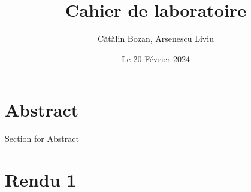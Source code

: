 \documentclass{article}
\title{Cahier de laboratoire}
\date{Le 20 Février 2024}
\author{Cătălin Bozan, Arsenescu Liviu}
\begin{document}
    \maketitle
    \newpage

    \section*{Abstract}
    Section for Abstract
    \newpage

    \tableofcontents
    \newpage

    \section{Rendu 1}
\end{document}
